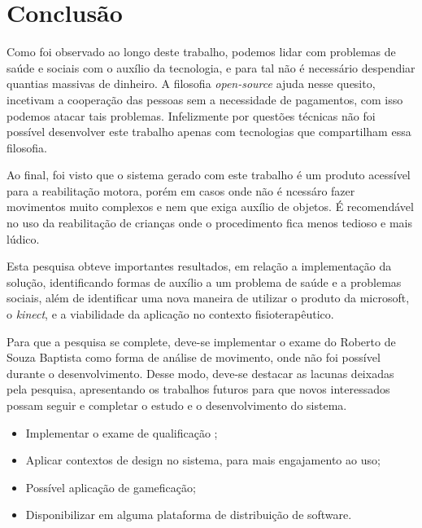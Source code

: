 \chapter[Conclusão]{Conclusão}\label{ch:conclusao}
  Como foi observado ao longo deste trabalho, podemos lidar com problemas de saúde e sociais com o auxílio da tecnologia,
e para tal não é necessário despendiar quantias massivas de dinheiro. A filosofia \textit{open-source} ajuda nesse quesito, incetivam a cooperação das pessoas
sem a necessidade de pagamentos, com isso podemos atacar tais problemas. Infelizmente por questões  técnicas não foi possível desenvolver este trabalho apenas com
tecnologias que compartilham essa filosofia.

  Ao final, foi visto que o sistema gerado com este trabalho é um produto acessível para a reabilitação motora, porém em casos onde não é ncessáro
fazer movimentos muito complexos e nem que exiga auxílio de objetos. É recomendável no uso da reabilitação de crianças onde o procedimento
fica menos tedioso e mais lúdico.

Esta pesquisa obteve importantes resultados, em relação a implementação da solução, identificando
formas de auxílio a um problema de saúde e a problemas sociais, além de identificar uma nova maneira de utilizar o produto da microsoft, o
\textit{kinect}, e a viabilidade da aplicação no
contexto fisioterapêutico.

Para que a pesquisa se complete, deve-se implementar o exame do Roberto de Souza Baptista\cite{roberto} como forma
de análise de movimento, onde não foi possível durante o desenvolvimento. Desse modo, deve-se destacar as lacunas
deixadas pela pesquisa, apresentando os trabalhos futuros para que novos interessados
possam seguir e completar o estudo e o desenvolvimento do sistema.
\begin{itemize}
  \item Implementar o exame de qualificação \cite{roberto};
  \item Aplicar contextos de design no sistema, para mais engajamento ao uso;
  \item Possível aplicação de gameficação;
  \item Disponibilizar em alguma plataforma de distribuição de software.
\end{itemize}
